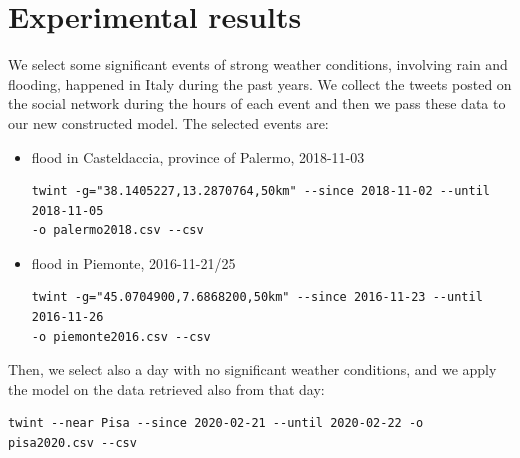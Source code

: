 \documentclass[a4paper]{article}
\begin{document}
\section{Experimental results}
We select some significant events of strong weather conditions, involving rain and flooding, happened in Italy during the past years. We collect the tweets posted on the social network during the hours of each event and then we pass these data to our new constructed model. The selected events are:
\begin{itemize}
\item flood in Casteldaccia, province of Palermo, 2018-11-03
\begin{verbatim}
twint -g="38.1405227,13.2870764,50km" --since 2018-11-02 --until 2018-11-05 
-o palermo2018.csv --csv
\end{verbatim}
\item flood in Piemonte, 2016-11-21/25
\begin{verbatim}
twint -g="45.0704900,7.6868200,50km" --since 2016-11-23 --until 2016-11-26 
-o piemonte2016.csv --csv
\end{verbatim}
\end{itemize}
Then, we select also a day with no significant weather conditions, and we apply the model on the data retrieved also from that day:
\begin{verbatim}
twint --near Pisa --since 2020-02-21 --until 2020-02-22 -o pisa2020.csv --csv
\end{verbatim}
\end{document}
